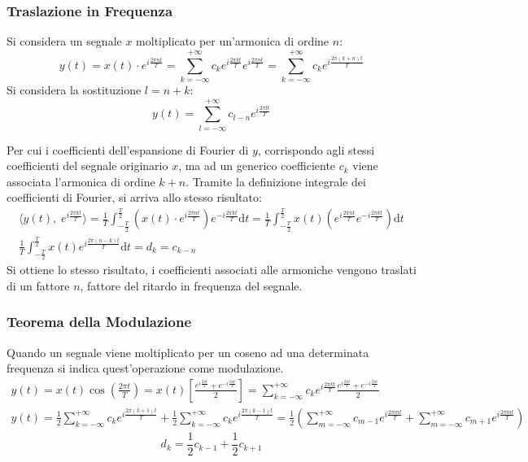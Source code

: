\documentclass{article}
\newcommand{\df}{\mathrm{d}}
\numberwithin{equation}{subsection}
\begin{document}
\subsubsection{Traslazione in Frequenza}

Si considera un segnale $x$ moltiplicato per un'armonica di ordine $n$:
\begin{equation*}
    y(t)=x(t)\cdot e^{i\frac{2\pi nt}{T}}=\displaystyle\sum_{k=-\infty}^{+\infty}c_ke^{i\frac{2\pi kt}{T}}e^{i\frac{2\pi nt}{T}}=\sum_{k=-\infty}^{+\infty}c_ke^{i\frac{2\pi (k+n)t}{T}}
\end{equation*}
Si considera la sostituzione $l=n+k$:
\begin{equation}
    y(t)=\displaystyle\sum_{l=-\infty}^{+\infty}c_{l-n}e^{i\frac{2\pi lt}{T}}
\end{equation}

Per cui i coefficienti dell'espansione di Fourier di $y$, corrispondo agli stessi coefficienti del segnale originario $x$, ma ad un generico coefficiente $c_k$ viene 
associata l'armonica di ordine $k+n$.   
Tramite la definizione integrale dei coefficienti di Fourier, si arriva allo stesso risultato:
\begin{gather*}
    \langle y(t),\;e^{i\frac{2\pi kt}{T}}\rangle=\displaystyle\frac{1}{T}\int_{-\frac{T}{2}}^{\frac{T}{2}}\left(x(t)\cdot e^{i\frac{2\pi nt}{T}}\right)e^{-i\frac{2\pi kt}{T}}\df t=\frac{1}{T}\int_{-\frac{T}{2}}^{\frac{T}{2}}x(t)\left(e^{i\frac{2\pi nt}{T}}e^{-i\frac{2\pi kt}{T}}\right)\df t\\
    \displaystyle\frac{1}{T}\int_{-\frac{T}{2}}^{\frac{T}{2}}x(t)e^{i\frac{2\pi (n-k)t}{T}}\df t=d_k=c_{k-n}
\end{gather*}
Si ottiene lo stesso risultato, i coefficienti associati alle armoniche vengono traslati di un fattore $n$, fattore del ritardo in frequenza del segnale.  

\subsubsection{Teorema della Modulazione}

Quando un segnale viene moltiplicato per un coseno ad una determinata frequenza si indica quest'operazione come modulazione. 
\begin{gather*}
    y(t)=x(t)\cos\displaystyle\left(\frac{2\pi t}{T}\right)=x(t)\left[\frac{e^{i\frac{2\pi t}{T}}+e^{-i\frac{2\pi t}{T}}}{2}\right]=\sum_{k=-\infty}^{+\infty}c_ke^{i\frac{2\pi kt}{T}}\frac{e^{i\frac{2\pi t}{T}}+e^{-i\frac{2\pi t}{T}}}{2}\\
    y(t)=\displaystyle\frac{1}{2}\sum_{k=-\infty}^{+\infty}c_ke^{i\frac{2\pi (k+1)t}{T}}+\frac{1}{2}\sum_{k=-\infty}^{+\infty}c_ke^{i\frac{2\pi (k-1)t}{T}}=\frac{1}{2}\left(\sum_{m=-\infty}^{+\infty}c_{m-1}e^{i\frac{2\pi mt}{T}}+\sum_{m=-\infty}^{+\infty}c_{m+1}e^{i\frac{2\pi mt}{T}}\right)
\end{gather*}
\begin{equation}
    d_k=\displaystyle\frac{1}{2}c_{k-1}+\frac{1}{2}c_{k+1}
\end{equation}
\end{document}
